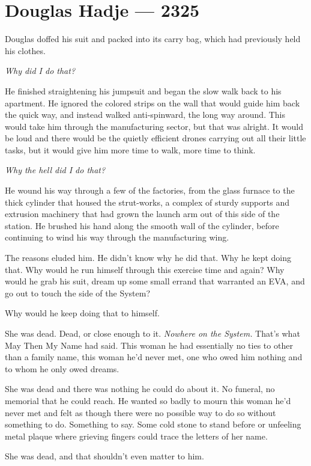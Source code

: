 \hypertarget{douglas-hadje-2325}{%
\chapter{Douglas Hadje — 2325}\label{douglas-hadje-2325}}

Douglas doffed his suit and packed into its carry bag, which had previously held his clothes.

\emph{Why did I do that?}

He finished straightening his jumpsuit and began the slow walk back to his apartment. He ignored the colored strips on the wall that would guide him back the quick way, and instead walked anti-spinward, the long way around. This would take him through the manufacturing sector, but that was alright. It would be loud and there would be the quietly efficient drones carrying out all their little tasks, but it would give him more time to walk, more time to think.

\emph{Why the hell did I do that?}

He wound his way through a few of the factories, from the glass furnace to the thick cylinder that housed the strut-works, a complex of sturdy supports and extrusion machinery that had grown the launch arm out of this side of the station. He brushed his hand along the smooth wall of the cylinder, before continuing to wind his way through the manufacturing wing.

The reasons eluded him. He didn't know why he did that. Why he kept doing that. Why would he run himself through this exercise time and again? Why would he grab his suit, dream up some small errand that warranted an EVA, and go out to touch the side of the System?

Why would he keep doing that to himself.

She was dead. Dead, or close enough to it. \emph{Nowhere on the System.} That's what May Then My Name had said. This woman he had essentially no ties to other than a family name, this woman he'd never met, one who owed him nothing and to whom he only owed dreams.

She was dead and there was nothing he could do about it. No funeral, no memorial that he could reach. He wanted so badly to mourn this woman he'd never met and felt as though there were no possible way to do so without something to do. Something to say. Some cold stone to stand before or unfeeling metal plaque where grieving fingers could trace the letters of her name.

She was dead, and that shouldn't even matter to him.

